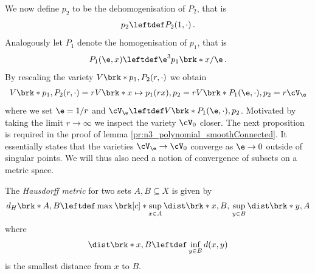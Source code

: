 We now define $p_2$ to be the dehomogenisation of $P_2$, that is
\begin{align}
  p_2\leftdef P_2(1,\cdot)\,.\label{eq:n3_polynomial_defp2}
\end{align}
Analogously let $P_1$ denote the homogenisation of $p_1$, that is
\begin{align}
  P_1(\e,x)\leftdef\e^3p_1\brk*{x/\e}\,.\label{eq:n3_polynomial_defP1}
\end{align}
By rescaling the variety $V\brk*{p_1,P_2(r,\cdot)}$ we obtain
\begin{align}
  V\brk*{p_1,P_2(r,\cdot)}=rV\brk*{x\mapsto p_1(rx),p_2}
  =rV\brk*{P_1(\e,\cdot),p_2}=r\cV_\e\label{eq:n3_polynomial_smoothConnected_relVeps}
\end{align}
where we set $\e=1/r$ and $\cV_\e\leftdef V\brk*{P_1(\e,\cdot),p_2}$. Motivated by taking the limit $r\to\infty$ we
inspect the variety $\cV_0$ closer.
The next proposition is required in the proof of lemma \ref{pr:n3_polynomial_smoothConnected}. It essentially states that the varieties
$\cV_\e\to\cV_0$ converge as $\e\to0$ outside of singular points.
We will thus also need a notion of convergence of subsets on a metric space.
\begin{definition}
  The \emph{Hausdorff metric} for two sets $A,B\subseteq X$ is given by 
  \begin{align}
    d_H\brk*{A,B}\leftdef\max\brk[c]*{\sup_{x\in A}\dist\brk*{x,B},\,\sup_{y\in B}\dist\brk*{y,A}}
    \label{eq:def_HausdorffMetric}
  \end{align}
  where
  \begin{align}
    \dist\brk*{x,B}\leftdef\inf_{y\in B}d(x,y)\label{eq:def_distance}
  \end{align}
  is the smallest distance from $x$ to $B$.
\end{definition}

